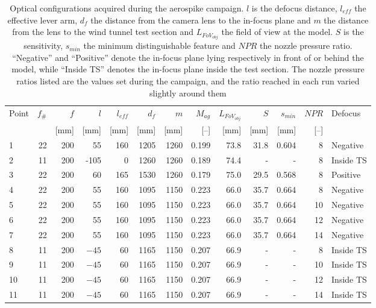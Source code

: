 \begin{table}[htbp]
    \centering
    \caption[Test matrix of the aerospike campaign]{Optical configurations acquired during the aerospike campaign. $l$ is the defocus distance, $l_{eff}$ the effective lever arm, $d_f$ the distance from the camera lens to the in-focus plane and $m$ the distance from the lens to the wind tunnel test section and $L_{FoV_{obj}}$ the field of view at the model. $S$ is the sensitivity, $s_{min}$ the minimum distinguishable feature and $NPR$ the nozzle pressure ratio. ``Negative'' and ``Positive'' denote the in-focus plane lying respectively in front of or behind the model, while ``Inside TS'' denotes the in-focus plane inside the test section. The nozzle pressure ratios listed are the values set during the campaign, and the ratio reached in each run varied slightly around them}
    \label{tab: aerospike test matrix}
    \small
    \begin{tabular}{lrrrrrrrrrrrl}
        \toprule
        Point & $f_\#$ & $f$ & $l$ & $l_{eff}$ & $d_f$ & $m$ & $M_{ag}$ & $L_{FoV_{obj}}$ & $S$ & $s_{min}$ & $NPR$ & Defocus \\
              &        & [mm] & [mm] & [mm] & [mm] & [mm] & [--] & [mm] & [mm] & [mm] & [--] & \\
        \midrule
         1 & 22 & 200 &  55 & 160 & 1205 & 1260 & 0.199 & 73.8 & 31.8 & 0.604 &  8 & Negative \\
         2 & 11 & 200 &   -105 & 0 & 1260 & 1260 & 0.189 & 74.4 & - & - &  8 & Inside TS \\
         3 & 22 & 200 &  60 & 165 & 1530 & 1260 & 0.179 & 75.0 & 29.5 & 0.568 &  8 & Positive \\
        \midrule
         4 & 22 & 200 &  55 & 160 & 1095 & 1150 & 0.223 & 66.0 & 35.7 & 0.664 &  8 & Negative \\
         5 & 22 & 200 &  55 & 160 & 1095 & 1150 & 0.223 & 66.0 & 35.7 & 0.664 & 10 & Negative \\
         6 & 22 & 200 &  55 & 160 & 1095 & 1150 & 0.223 & 66.0 & 35.7 & 0.664 & 12 & Negative \\
         7 & 22 & 200 &  55 & 160 & 1095 & 1150 & 0.223 & 66.0 & 35.7 & 0.664 & 14 & Negative \\
         8 & 11 & 200 & $-45$ &  60 & 1165 & 1150 & 0.207 & 66.9 & - & - &  8 & Inside TS \\
         9 & 11 & 200 & $-45$ &  60 & 1165 & 1150 & 0.207 & 66.9 & - & - & 10 & Inside TS \\
        10 & 11 & 200 & $-45$ &  60 & 1165 & 1150 & 0.207 & 66.9 & - & - & 12 & Inside TS \\
        11 & 11 & 200 & $-45$ &  60 & 1165 & 1150 & 0.207 & 66.9 & - & - & 14 & Inside TS\\
        \bottomrule
    \end{tabular}
\end{table}

